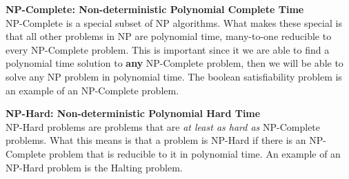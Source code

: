 \documentclass[9pt]{extarticle} %
\begin{document}
\begin{minipage}[t]{.53\linewidth}
\textbf{NP-Complete: Non-deterministic Polynomial Complete Time} \\
NP-Complete is a special subset of NP algorithms. What makes these special is
that all other problems in NP are polynomial time, many-to-one reducible to
every NP-Complete problem. This is important since it we are able to find a
polynomial time solution to \textbf{any} NP-Complete problem, then we will be
able to solve any NP problem in polynomial time. The boolean satisfiability
problem is an example of an NP-Complete problem.

\textbf{NP-Hard: Non-deterministic Polynomial Hard Time} \\
NP-Hard problems are problems that are \textit{at least as hard as} NP-Complete
problems. What this means is that a problem is NP-Hard if there is an
NP-Complete problem that is reducible to it in polynomial time. An example of an
NP-Hard problem is the Halting problem.


\end{minipage} %
\end{document}
